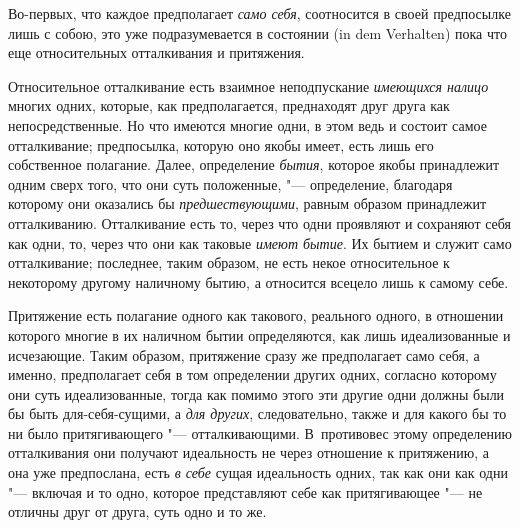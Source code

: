 Во-первых, что каждое предполагает {\em само себя}, соотносится в своей
предпосылке лишь с собою, это уже подразумевается в состоянии
(in dem Verhalten) пока что еще относительных отталкивания и притяжения.

Относительное отталкивание есть взаимное неподпускание
{\em имеющихся налицо} многих одних, которые, как
предполагается, преднаходят друг друга как непосредственные. Но что имеются
многие одни, в этом ведь и состоит самое отталкивание; предпосылка, которую
оно якобы имеет, есть лишь его собственное полагание. Далее, определение
{\em бытия}, которое якобы принадлежит одним сверх
того, что они суть положенные, "--- определение, благодаря которому они
оказались бы {\em предшествующими}, равным образом
принадлежит отталкиванию. Отталкивание есть то, через что одни проявляют и
сохраняют себя как одни, то, через что они как таковые
{\em имеют бытие}. Их бытием и служит само
отталкивание; последнее, таким образом, не есть некое относительное к
некоторому другому наличному бытию, а относится всецело лишь к самому себе.

Притяжение есть полагание одного как такового, реального одного, в отношении
которого многие в их наличном бытии определяются, как лишь идеализованные и
исчезающие. Таким образом, притяжение сразу же предполагает само себя, а
именно, предполагает себя в том определении других одних, согласно которому
они суть идеализованные, тогда как помимо этого эти другие одни должны были
бы быть для-себя-сущими, а {\em для других},
следовательно, также и для какого бы то ни было притягивающего
"--- отталкивающими. В~противовес этому определению отталкивания они получают
идеальность не через отношение к притяжению, а она уже предпослана, есть
{\em в себе} сущая идеальность одних, так как они как одни "--- включая
и то одно, которое представляют себе как притягивающее "--- не
отличны друг от друга, суть одно и то же.

